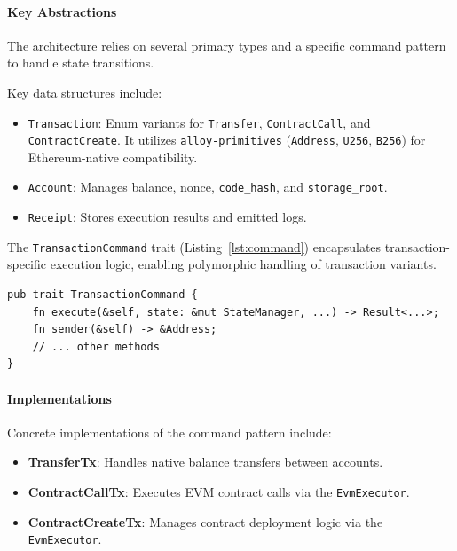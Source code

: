 \paragraph{Key Abstractions}
The architecture relies on several primary types and a specific command pattern to handle state transitions.

\begin{description}[style=nextline, leftmargin=*]
    \item[Key Types] 
    Key data structures include:
    \begin{itemize}
        \item \texttt{Transaction}: Enum variants for \texttt{Transfer}, \texttt{ContractCall}, and \texttt{ContractCreate}. It utilizes \texttt{alloy-primitives} (\texttt{Address}, \texttt{U256}, \texttt{B256}) for Ethereum-native compatibility.
        \item \texttt{Account}: Manages balance, nonce, \texttt{code\_hash}, and \texttt{storage\_root}.
        \item \texttt{Receipt}: Stores execution results and emitted logs.
    \end{itemize}

    \item[The Command Pattern] 
    The \texttt{TransactionCommand} trait (Listing~\ref{lst:command}) encapsulates transaction-specific execution logic, enabling polymorphic handling of transaction variants.
\end{description}

\begin{lstlisting}[style=rustStyle, caption={The Transaction Command Trait}, label={lst:command}]
pub trait TransactionCommand {
    fn execute(&self, state: &mut StateManager, ...) -> Result<...>;
    fn sender(&self) -> &Address;
    // ... other methods
}
\end{lstlisting}

\paragraph{Implementations}
Concrete implementations of the command pattern include:
\begin{itemize}
    \item \textbf{TransferTx}: Handles native balance transfers between accounts.
    \item \textbf{ContractCallTx}: Executes EVM contract calls via the \texttt{EvmExecutor}.
    \item \textbf{ContractCreateTx}: Manages contract deployment logic via the \texttt{EvmExecutor}.
\end{itemize}

